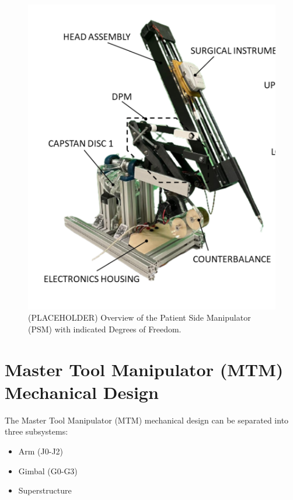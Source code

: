 \begin{figure}[htb!] %
    \centering
    \includegraphics[width=1.0\linewidth]{figures/psm_overview.png} %
    \caption{(PLACEHOLDER) Overview of the Patient Side Manipulator (PSM) with indicated Degrees of Freedom.}
    \label{fig:psm_overview}
\end{figure}

\section{Master Tool Manipulator (MTM) Mechanical Design}

The Master Tool Manipulator (MTM) mechanical design can be separated into three subsystems:
\begin{itemize}
    \item Arm (J0-J2)
    \item Gimbal (G0-G3)
    \item Superstructure
\end{itemize}


